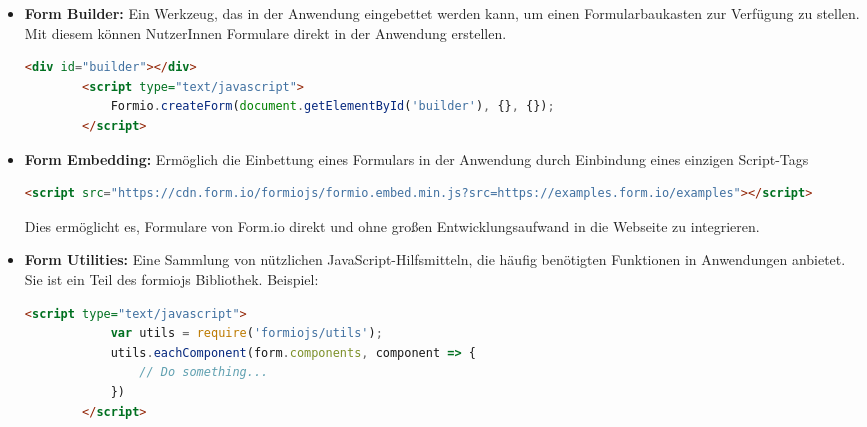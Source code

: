 \begin{itemize}
\begin{adjustwidth}{-5em}{0pt}
\begin{lstlisting}[language=HTML]
                    key: 'email',
                    label: 'Email'
                },
                {
                    type: 'button',
                    key: 'submit',
                    label: 'Submit'
                }]
            });
        </script>
    \end{lstlisting}
    \end{adjustwidth}
    \item \textbf{Form Builder:} Ein Werkzeug, das in der Anwendung eingebettet werden kann, um einen Formularbaukasten zur Verfügung zu stellen. Mit diesem können NutzerInnen Formulare direkt in der Anwendung erstellen.
    \begin{adjustwidth}{-5em}{0pt}
    \begin{lstlisting}[language=HTML]
        <div id="builder"></div>
        <script type="text/javascript">
            Formio.createForm(document.getElementById('builder'), {}, {});
        </script>
    \end{lstlisting}
    \end{adjustwidth}
    \item \textbf{Form Embedding:} Ermöglich die Einbettung eines Formulars in der Anwendung durch Einbindung eines einzigen Script-Tags
    \begin{adjustwidth}{-5em}{0pt}
    \begin{lstlisting}[language=HTML]
        <script src="https://cdn.form.io/formiojs/formio.embed.min.js?src=https://examples.form.io/examples"></script>
    \end{lstlisting}
    \end{adjustwidth}
    Dies ermöglicht es, Formulare von Form.io direkt und ohne großen Entwicklungsaufwand in die Webseite zu integrieren.
    \item \textbf{Form Utilities:} Eine Sammlung von nützlichen JavaScript-Hilfsmitteln, die häufig benötigten Funktionen in Anwendungen anbietet. Sie ist ein Teil des formiojs Bibliothek. Beispiel:
    \begin{adjustwidth}{-5em}{0pt}
    \begin{lstlisting}[language=HTML]
        <script type="text/javascript">
            var utils = require('formiojs/utils');
            utils.eachComponent(form.components, component => {
                // Do something...
            })
        </script>
    \end{lstlisting}
    \end{adjustwidth}
\end{itemize}

